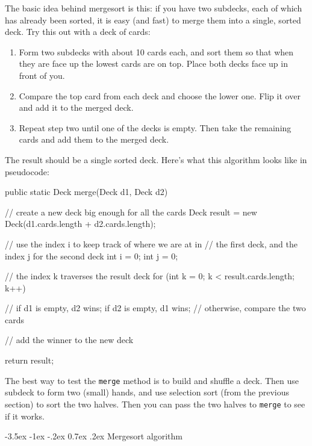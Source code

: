 \documentclass[12pt]{book}
\makeatletter
\theoremstyle{exercise}
\newcommand{\java}[1]{\verb"#1"}
\renewcommand{\section}{\@startsection{section}{1}{\z@}%
    {-3.5ex \@plus -1ex \@minus -.2ex}%
    {0.7ex \@plus.2ex}%
    {\normalfont\Large\bfseries}}
\newcommand{\java}[1]{\lstinline{#1}} %
\makeatother
\begin{document}
The basic idea behind mergesort is this: if you have two subdecks, each of which has already been sorted, it is easy (and fast) to merge them into a single, sorted deck.
Try this out with a deck of cards:

\begin{enumerate}

\item Form two subdecks with about 10 cards each, and sort them so that when they are face up the lowest cards are on top.
Place both decks face up in front of you.

\item Compare the top card from each deck and choose the lower one.
Flip it over and add it to the merged deck.

\item Repeat step two until one of the decks is empty.
Then take the remaining cards and add them to the merged deck.

\end{enumerate}

The result should be a single sorted deck.
Here's what this algorithm looks like in pseudocode:

\begin{code}
public static Deck merge(Deck d1, Deck d2) {
    // create a new deck big enough for all the cards
    Deck result = new Deck(d1.cards.length + d2.cards.length);

    // use the index i to keep track of where we are at in
    // the first deck, and the index j for the second deck
    int i = 0;
    int j = 0;

    // the index k traverses the result deck
    for (int k = 0; k < result.cards.length; k++) {

        // if d1 is empty, d2 wins; if d2 is empty, d1 wins;
        // otherwise, compare the two cards

        // add the winner to the new deck
    }
    return result;
}
\end{code}


The best way to test the \java{merge} method is to build and shuffle a deck.
Then use subdeck to form two (small) hands, and use selection sort (from the previous section) to sort the two halves.
Then you can pass the two halves to \java{merge} to see if it works.

\section{Mergesort algorithm}
\end{document}
